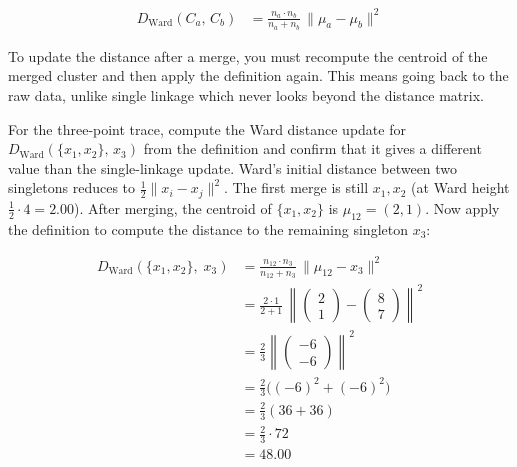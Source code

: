\begin{align*}
    D_{\mathrm{Ward}}(C_a,\, C_b) &= \frac{n_a \cdot n_b}{n_a + n_b}\,\|\mu_a - \mu_b\|^2
\end{align*}

To update the distance after a merge, you must recompute the centroid of the merged cluster and then apply the definition again.
This means going back to the raw data, unlike single linkage which never looks beyond the distance matrix.


For the three-point trace, compute the Ward distance update for $D_{\mathrm{Ward}}(\{x_1,x_2\},\, x_3)$ from the definition and confirm that it gives a different value than the single-linkage update.
Ward's initial distance between two singletons reduces to $\tfrac{1}{2}\|x_i - x_j\|^2$.
The first merge is still $x_1, x_2$ (at Ward height $\tfrac{1}{2} \cdot 4 = 2.00$).
After merging, the centroid of $\{x_1, x_2\}$ is $\mu_{12} = (2, 1)$.
Now apply the definition to compute the distance to the remaining singleton $x_3$:

\begin{align*}
    D_{\mathrm{Ward}}\!\left(\{x_1,x_2\},\; x_3\right) &= \frac{n_{12} \cdot n_3}{n_{12} + n_3}\,\|\mu_{12} - x_3\|^2 \\
                                                          &= \frac{2 \cdot 1}{2+1}\,\left\|\begin{pmatrix}2\\1\end{pmatrix} - \begin{pmatrix}8\\7\end{pmatrix}\right\|^2 \\
                                                          &= \frac{2}{3}\left\|\begin{pmatrix}-6\\-6\end{pmatrix}\right\|^2 \\
                                                          &= \frac{2}{3}\bigl((-6)^2 + (-6)^2\bigr) \\
                                                          &= \frac{2}{3}(36 + 36) \\
                                                          &= \frac{2}{3} \cdot 72 \\
                                                          &= 48.00
\end{align*}

